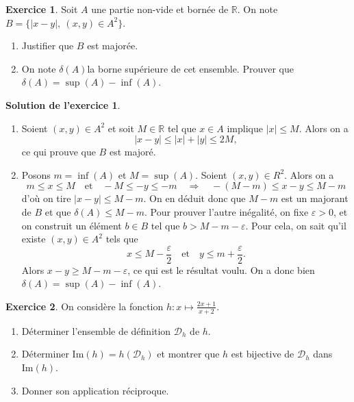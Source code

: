 \documentclass[a4paper, 11pt,openany]{article}%
\theoremstyle{plain}
\theoremstyle{definition}
\newtheorem{exo}{Exercice}
\newtheorem{sol}{Solution de l'exercice}
\theoremstyle{remark}
\newcommand{\R}{\mathbb{R}}
\newcommand{\calD}{\mathcal{D}}
\newcommand{\im}{\text{Im}}
\begin{document}
\begin{exo}
Soit $A$ une partie non-vide et bornée de $\R$. On note $B=\{|x-y|, \ (x,y)\in A^2\}$.
\begin{enumerate}
\item Justifier que $B$ est majorée.
\item On note $\delta(A)$la borne supérieure de cet ensemble. Prouver que $\delta(A)=\sup(A)-\inf(A)$. \end{enumerate}
\end{exo}

\begin{sol}
\begin{enumerate}
\item Soient $(x,y) \in A^2$ et soit $M \in \R$ tel que $x \in A$ implique $|x| \leqslant M$. Alors on a 
\[ |x-y|\leqslant |x|+|y| \leqslant 2M,\]
ce qui prouve que $B$ est majoré. 
\item Posons $m=\inf(A)$ et $M=\sup(A)$. Soient $(x,y)\in R^2$. Alors on a 
\[ m \leqslant x \leqslant M \quad \text{et} \quad -M \leqslant -y \leqslant -m \quad \Rightarrow \quad -(M-m)\leqslant x-y \leqslant M-m\]
d'où on tire $|x-y|\leqslant M-m$. On en déduit donc que $M-m$ est un majorant de $B$ et que $\delta (A)\leqslant M-m$. Pour prouver l'autre inégalité, on fixe $\varepsilon >0$, et on construit un élément $b \in B$ tel que $b>M-m-\varepsilon$. Pour cela, on sait qu'il existe $(x,y) \in A^2$ tels que 
\[ x \leqslant M- \frac{\varepsilon}{2} \quad \text{et}\quad  y \leqslant m + \frac{\varepsilon}{2}.\] Alors $x-y\geqslant M-m- \varepsilon$, ce qui est le résultat voulu. On a donc bien $\delta(A)=\sup(A)-\inf(A)$.
\end{enumerate}
\end{sol}

\begin{exo}
On considère la fonction
$\displaystyle{h : x \mapsto \frac{2x+1}{x+2}}$.
\begin{enumerate}
\item Déterminer l'ensemble de définition $\calD_h$ de $h$.
\item Déterminer $\im(h) = h(\calD_h)$ et montrer que $h$ est bijective de $\calD_h$ dans $\im(h)$.
\item Donner son application réciproque.
\end{enumerate}
\end{exo}
\end{document}
